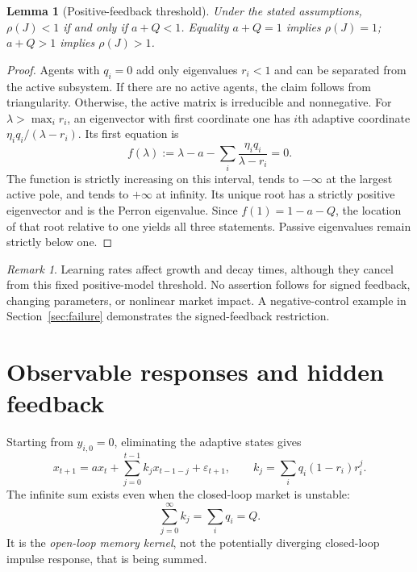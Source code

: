 \documentclass[11pt]{article}
\newtheorem{lemma}[theorem]{Lemma}
\theoremstyle{remark}\newtheorem{remark}[theorem]{Remark}
\newcommand{\ee}{\varepsilon}
\begin{document}
\begin{lemma}[Positive-feedback threshold]\label{lem:threshold}
Under the stated assumptions, $\rho(J)<1$ if and only if $a+Q<1$. Equality $a+Q=1$ implies $\rho(J)=1$; $a+Q>1$ implies $\rho(J)>1$.
\end{lemma}
\begin{proof}
Agents with $q_i=0$ add only eigenvalues $r_i<1$ and can be separated from the active subsystem. If there are no active agents, the claim follows from triangularity. Otherwise, the active matrix is irreducible and nonnegative. For $\lambda>\max_i r_i$, an eigenvector with first coordinate one has $i$th adaptive coordinate $\eta_iq_i/(\lambda-r_i)$. Its first equation is
\begin{equation}
 f(\lambda):=\lambda-a-\sum_i\frac{\eta_iq_i}{\lambda-r_i}=0.
\end{equation}
The function is strictly increasing on this interval, tends to $-\infty$ at the largest active pole, and tends to $+\infty$ at infinity. Its unique root has a strictly positive eigenvector and is the Perron eigenvalue. Since $f(1)=1-a-Q$, the location of that root relative to one yields all three statements. Passive eigenvalues remain strictly below one.
\end{proof}
\begin{remark}
Learning rates affect growth and decay times, although they cancel from this fixed positive-model threshold. No assertion follows for signed feedback, changing parameters, or nonlinear market impact. A negative-control example in Section~\ref{sec:failure} demonstrates the signed-feedback restriction.
\end{remark}

\section{Observable responses and hidden feedback}
Starting from $y_{i,0}=0$, eliminating the adaptive states gives
\begin{equation}
 x_{t+1}=a x_t+\sum_{j=0}^{t-1}k_jx_{t-1-j}+\ee_{t+1},\qquad
 k_j=\sum_iq_i(1-r_i)r_i^j.\label{eq:kernel}
\end{equation}
The infinite sum exists even when the closed-loop market is unstable:
\begin{equation}
 \sum_{j=0}^{\infty}k_j=\sum_iq_i=Q.\label{eq:Q}
\end{equation}
It is the \emph{open-loop memory kernel}, not the potentially diverging closed-loop impulse response, that is being summed.
\end{document}
